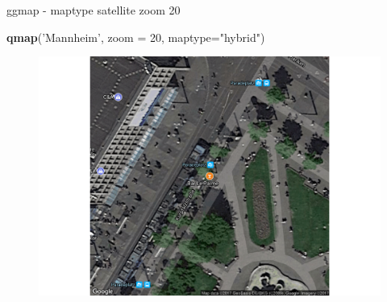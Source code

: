 \documentclass[ignorenonframetext,]{beamer}
\newenvironment{Shaded}{}{}
\newcommand{\KeywordTok}[1]{\textcolor[rgb]{0.00,0.44,0.13}{\textbf{{#1}}}}
\newcommand{\DataTypeTok}[1]{\textcolor[rgb]{0.56,0.13,0.00}{{#1}}}
\newcommand{\DecValTok}[1]{\textcolor[rgb]{0.25,0.63,0.44}{{#1}}}
\newcommand{\StringTok}[1]{\textcolor[rgb]{0.25,0.44,0.63}{{#1}}}
\newcommand{\NormalTok}[1]{{#1}}
\begin{document}
\begin{frame}[fragile]{ggmap - maptype satellite zoom 20}

\begin{Shaded}
\begin{Highlighting}[]
\KeywordTok{qmap}\NormalTok{(}\StringTok{'Mannheim'}\NormalTok{, }\DataTypeTok{zoom =} \DecValTok{20}\NormalTok{, }\DataTypeTok{maptype=}\StringTok{"hybrid"}\NormalTok{)}
\end{Highlighting}
\end{Shaded}

\begin{figure}[htbp]
\centering
\includegraphics{RSocialScience2_files/figure-beamer/unnamed-chunk-38-1.pdf}
\caption{}
\end{figure}

\end{frame}
\end{document}
